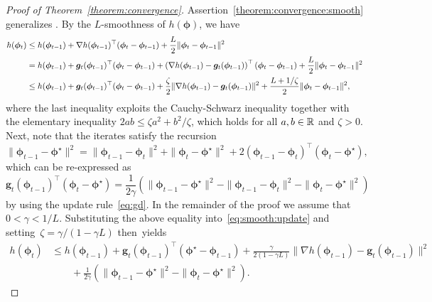 \documentclass[11pt, a4paper, oneside, reqno]{article}
\begin{document}
\begin{proof} [Proof of Theorem~\ref{theorem:convergence}]
		Assertion~\ref{theorem:convergence:smooth} generalizes \citep[Theorem~1]{dekel2012optimal}.
		By the $L$-smoothness of $h(\bm \phi)$, we have
		\begin{align}
		h(\bm \phi_{t}) 
		&\leq h(\bm \phi_{t-1}) + \nabla h(\bm \phi_{t-1})^\top (\bm \phi_{t} - \bm \phi_{t-1}) + \frac{L}{2}\|\bm \phi_{t} - \bm \phi_{t-1}\|^2  \notag \\
		&= h(\bm \phi_{t-1}) + \bm g_t(\bm \phi_{t-1})^\top (\bm \phi_{t} - \bm \phi_{t-1}) + \bm \left( \nabla h(\bm \phi_{t-1}) - \bm g_t(\bm \phi_{t-1}) \right)^\top (\bm \phi_{t} - \bm \phi_{t-1}) + \frac{L}{2}\|\bm \phi_{t} - \bm \phi_{t-1}\|^2 \notag \\
		&\leq h(\bm \phi_{t-1}) + \bm g_t(\bm \phi_{t-1})^\top (\bm \phi_{t} - \bm \phi_{t-1}) + \frac{\zeta}{2}\| \nabla h(\bm \phi_{t-1}) - \bm g_t(\bm \phi_{t-1}) \|^2 + \frac{L + 1/\zeta}{2}\|\bm \phi_{t} - \bm \phi_{t-1}\|^2, \label{eq:smooth:update}
		\end{align}
		where the last inequality exploits the Cauchy-Schwarz inequality together with the elementary inequality $2ab \leq \zeta a^2 + b^2 / \zeta$, which holds for all $a,b\in\mathbb{R}$ and $\zeta > 0$.
		Next, note that the iterates satisfy the recursion
		\begin{equation*}
		\| \bm \phi_{t-1} - \bm \phi^\star \|^2 = \| \bm \phi_{t-1} - \bm \phi_{t} \|^2 + \| \bm \phi_{t} - \bm \phi^\star \|^2 + 2 (\bm \phi_{t-1} - \bm \phi_{t})^\top (\bm \phi_{t} - \bm \phi^\star),
		\end{equation*}
		which can be re-expressed as 
		\begin{equation*}
		\bm g_t(\bm \phi_{t-1})^\top (\bm \phi_{t} - \bm \phi^\star) = \frac{1}{2 \gamma} \left( \| \bm \phi_{t-1} - \bm \phi^\star \|^2 - \| \bm \phi_{t-1} - \bm \phi_{t} \|^2 - \| \bm \phi_{t} - \bm \phi^\star \|^2 \right)
		\end{equation*}
		by using the update rule~\eqref{eq:gd}. In the remainder of the proof we assume that $0 < \gamma < 1 / L$.  Substituting the above equality into~\eqref{eq:smooth:update} and setting~$\zeta = \gamma / (1 - \gamma L)$ then~yields
		\begin{align*}
		h(\bm \phi_{t}) 
		&\leq h(\bm \phi_{t-1}) + \bm g_t(\bm \phi_{t-1})^\top (\bm \phi^\star - \bm \phi_{t-1}) + \frac{\gamma}{2(1 - \gamma L)} \| \nabla h(\bm \phi_{t-1}) - \bm g_t(\bm \phi_{t-1}) \|^2 \\
		& \qquad + \frac{1}{2 \gamma} \left( \| \bm \phi_{t-1} - \bm \phi^\star \|^2 - \| \bm \phi_{t} - \bm \phi^\star \|^2 \right).
		\end{align*}

\end{proof}
\end{document}
